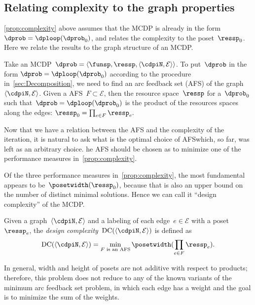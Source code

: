 \subsection{Relating complexity to the graph properties}

\cref{prop:complexity} above assumes that the MCDP is already in the form $\dprob=\dploop(\dprob_{0})$, and relates the complexity to
the poset~$\ressp_{0}$.
Here we relate the results to the graph structure of an MCDP.

Take an MCDP~$\dprob=\left\langle \funsp,\ressp,\left\langle \cdpiN,\mathcal{E}\right\rangle \right\rangle $.
To put~$\dprob$ in the form $\dprob=\dploop(\dprob_{0})$ according
to the procedure in~\cref{sec:Decomposition}, we need to find an arc
feedback set (AFS) of the graph~$\left\langle \cdpiN,\mathcal{E}\right\rangle $.
Given a AFS~$F\subset\mathcal{E}$, then the resource space~$\ressp$ for a~$\dprob_{0}$ such that~$\dprob=\dploop(\dprob_{0})$ is the product of the resources spaces along the edges: $\ressp_{0}=\prod_{e\in F}\ressp_{e}.$

Now that we have a relation between the AFS and the complexity of the iteration, it is natural to ask what is the optimal choice of
AFS\textemdash which, so far, was left as an arbitrary choice.
he AFS should be chosen as to minimize one of the performance measures in~\cref{prop:complexity}.

Of the three performance measures in~\cref{prop:complexity}, the most fundamental appears to be~$\posetwidth(\ressp_{0})$, because that is also an upper bound on the number of distinct minimal solutions.
Hence we can call it ``design complexity'' of the MCDP.
\begin{definition}
  \label{def:design-complexity}Given a graph~$\left\langle \cdpiN,\mathcal{E}\right\rangle $
  and a labeling of each edge~$e\in\mathcal{E}$ with a poset~$\ressp_{e}$,
  the \emph{design complexity~}$\text{DC}(\left\langle \cdpiN,\mathcal{E}\right\rangle )$
  is defined as
  \begin{equation}
    \text{DC}(\left\langle \cdpiN,\mathcal{E}\right\rangle )=\min_{F\text{ is an AFS}}\posetwidth(\prod_{e\in F}\ressp_{e}).\label{eq:complexity}
  \end{equation}
\end{definition}
In general, width and height of posets are not additive with respect
to products; therefore, this problem does not reduce to any of the
known variants of the minimum arc feedback set problem, in which
each edge has a weight and the goal is to minimize the sum of the
weights.

